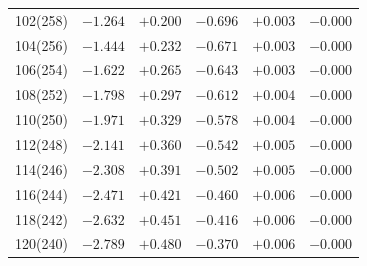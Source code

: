 \begin{table}[!h]
\begin{tabular}{rrrrrr}
  102(258) & $-1.264$ & $+0.200$ & $-0.696$ & $+0.003$ & $-0.000$\\
  104(256) & $-1.444$ & $+0.232$ & $-0.671$ & $+0.003$ & $-0.000$\\
  106(254) & $-1.622$ & $+0.265$ & $-0.643$ & $+0.003$ & $-0.000$\\
 108(252) & $-1.798$ & $+0.297$ & $-0.612$ & $+0.004$ & $-0.000$\\ 
 110(250) & $-1.971$ & $+0.329$ & $-0.578$ & $+0.004$ & $-0.000$\\
  112(248) & $-2.141$ & $+0.360$ & $-0.542$ & $+0.005$ & $-0.000$\\
  114(246) & $-2.308$ & $+0.391$ & $-0.502$ & $+0.005$ & $-0.000$\\
  116(244) & $-2.471$ & $+0.421$ & $-0.460$ & $+0.006$ & $-0.000$\\
  118(242) & $-2.632$ & $+0.451$ & $-0.416$ & $+0.006$ & $-0.000$\\
  120(240) & $-2.789$ & $+0.480$ & $-0.370$ & $+0.006$ & $-0.000$\\
\end{tabular}
\end{table}

